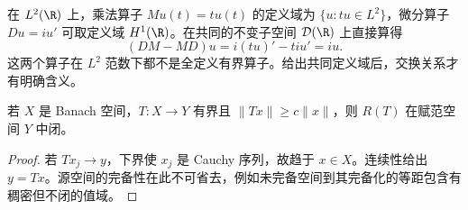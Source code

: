 \begin{example}[算子的非交换性与定义域]
在 $L^2(\R)$ 上，乘法算子 $Mu(t)=tu(t)$ 的定义域为 $\{u:tu\in L^2\}$，微分算子 $Du=iu'$ 可取定义域 $H^1(\R)$。在共同的不变子空间 $\Test(\R)$ 上直接算得
\[
 (DM-MD)u=i(tu)'-tiu'=iu.
\]
这两个算子在 $L^2$ 范数下都不是全定义有界算子。给出共同定义域后，交换关系才有明确含义。
\end{example}

\begin{proposition}[补充：有界下界与闭值域]
若 $X$ 是 Banach 空间，$T:X\to Y$ 有界且 $\|Tx\|\ge c\|x\|$，则 $R(T)$ 在赋范空间 $Y$ 中闭。
\end{proposition}
\begin{proof}
若 $Tx_j\to y$，下界使 $x_j$ 是 Cauchy 序列，故趋于 $x\in X$。连续性给出 $y=Tx$。源空间的完备性在此不可省去，例如未完备空间到其完备化的等距包含有稠密但不闭的值域。
\end{proof}
